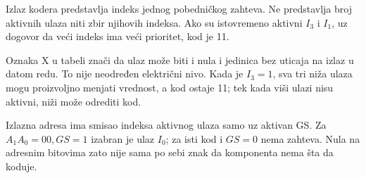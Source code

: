 
Izlaz kodera predstavlja indeks jednog pobedničkog zahteva. Ne predstavlja broj aktivnih ulaza niti zbir njihovih indeksa. Ako su istovremeno aktivni \(I_3\) i \(I_1\), uz dogovor da veći indeks ima veći prioritet, kod je 11.

Oznaka X u tabeli znači da ulaz može biti i nula i jedinica bez uticaja na izlaz u datom redu. To nije neodređen električni nivo. Kada je \(I_3=1\), sva tri niža ulaza mogu proizvoljno menjati vrednost, a kod ostaje 11; tek kada viši ulazi nisu aktivni, niži može odrediti kod.

Izlazna adresa ima smisao indeksa aktivnog ulaza samo uz aktivan GS. Za \(A_1A_0=00,GS=1\) izabran je ulaz \(I_0\); za isti kod i \(GS=0\) nema zahteva. Nula na adresnim bitovima zato nije sama po sebi znak da komponenta nema šta da koduje.
